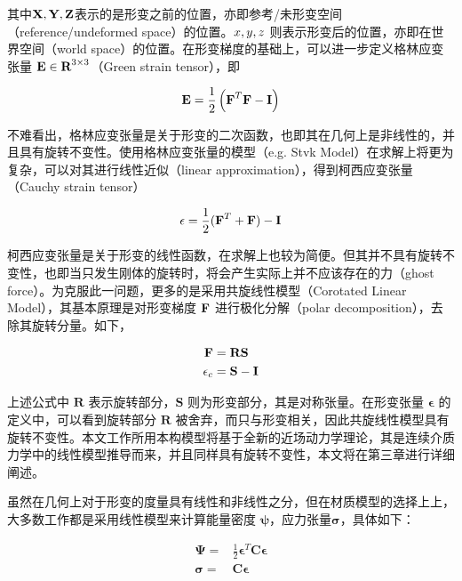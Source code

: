 其中$\textbf{X}, \textbf{Y}, \textbf{Z}$表示的是形变之前的位置，亦即参考/未形变空间（reference/undeformed space）的位置。$\boldmath{x}, \boldmath{y}, \boldmath{z}$ 则表示形变后的位置，亦即在世界空间（world space）的位置。在形变梯度的基础上，可以进一步定义格林应变张量 $\textbf{E} \in \textbf{R}^{3\times3}$（Green strain tensor），即

\begin{equation}
\textbf{E} = \frac{1}{2}\left(\textbf{F}^{T}\textbf{F} - \textbf{I}\right)
\end{equation}

不难看出，格林应变张量是关于形变的二次函数，也即其在几何上是非线性的，并且具有旋转不变性。使用格林应变张量的模型（e.g. Stvk Model）在求解上将更为复杂，可以对其进行线性近似（linear approximation），得到柯西应变张量（Cauchy strain tensor）

\begin{equation}
\mathbf{\epsilon} = \frac{1}{2}(\textbf{F}^T + \textbf{F}) - \textbf{I}
\end{equation}

柯西应变张量是关于形变的线性函数，在求解上也较为简便。但其并不具有旋转不变性，也即当只发生刚体的旋转时，将会产生实际上并不应该存在的力（ghost force）。为克服此一问题，更多的是采用共旋线性模型（Corotated Linear Model），其基本原理是对形变梯度 $\textbf{F}$ 进行极化分解（polar decomposition），去除其旋转分量。如下，

\begin{equation}
\begin{aligned}
\textbf{F} & = \textbf{RS} \\
\mathbf{\epsilon}_c & = \textbf{S} - \textbf{I}
\end{aligned}
\end{equation}

上述公式中 $\textbf{R}$ 表示旋转部分，$\textbf{S}$ 则为形变部分，其是对称张量。在形变张量 $\mathbf{\epsilon}$ 的定义中，可以看到旋转部分 $\textbf{R}$ 被舍弃，而只与形变相关，因此共旋线性模型具有旋转不变性。本文工作所用本构模型将基于全新的近场动力学理论，其是连续介质力学中的线性模型推导而来，并且同样具有旋转不变性，本文将在第三章进行详细阐述。

虽然在几何上对于形变的度量具有线性和非线性之分，但在材质模型的选择上上，大多数工作都是采用线性模型来计算能量密度 $\mathbf{\psi} $，应力张量$\mathbf{\sigma}$，具体如下：

\begin{equation}
\begin{aligned}
\mathbf{\Psi} = &\frac{1}{2}\mathbf{\epsilon}^T\textbf{C}\mathbf{\epsilon}\\
\mathbf{\sigma} = &\textbf{C}\mathbf{\epsilon}
\end{aligned}
\end{equation}

